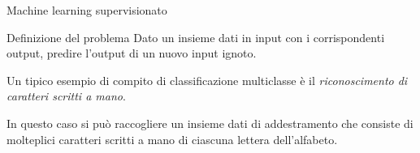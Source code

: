 \documentclass{beamer}
\begin{document}
    \begin{frame}{Machine learning supervisionato}
        \begin{block}{Definizione del problema}
            Dato un insieme dati in input con i corrispondenti output, predire l'output di un nuovo input ignoto. 
        \end{block}
        Un tipico esempio di compito di classificazione multiclasse è il 
        \emph{riconoscimento di caratteri scritti a mano}. 
        
        In questo caso si può raccogliere un insieme dati di addestramento che 
        consiste di molteplici caratteri scritti a mano di ciascuna lettera 
        dell'alfabeto. 
    \end{frame}
\end{document}
